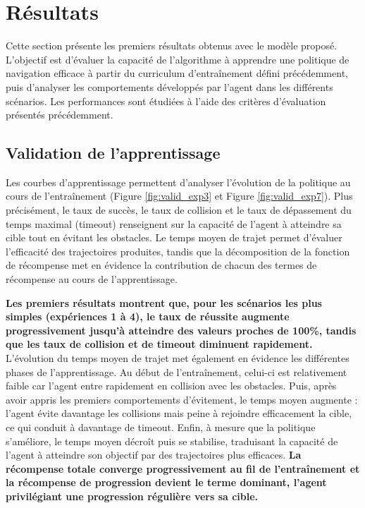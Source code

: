 \section{Résultats}

\begin{tcolorbox}[colback=black!5,colframe=black,title=]
Cette section présente les premiers résultats obtenus avec le modèle proposé. L'objectif est d'évaluer la capacité de l'algorithme à apprendre une politique de navigation efficace à partir du curriculum d'entraînement défini précédemment, puis d'analyser les comportements développés par l'agent dans les différents scénarios. Les performances sont étudiées à l'aide des critères d'évaluation présentés précédemment.
\end{tcolorbox}



\subsection{Validation de l'apprentissage}

\noindent Les courbes d'apprentissage permettent d'analyser l'évolution de la politique au cours de l'entraînement (Figure \ref{fig:valid_exp3} et Figure \ref{fig:valid_exp7}). Plus précisément, le taux de succès, le taux de collision et le taux de dépassement du temps maximal (timeout) renseignent sur la capacité de l'agent à atteindre sa cible tout en évitant les obstacles. Le temps moyen de trajet permet d'évaluer l'efficacité des trajectoires produites, tandis que la décomposition de la fonction de récompense met en évidence la contribution de chacun des termes de récompense au cours de l'apprentissage.

\vspace{10pt}

\noindent \textbf{Les premiers résultats montrent que, pour les scénarios les plus simples (expériences 1 à 4), le taux de réussite augmente progressivement jusqu'à atteindre des valeurs proches de 100\%, tandis que les taux de collision et de timeout diminuent rapidement.} L'évolution du temps moyen de trajet met également en évidence les différentes phases de l'apprentissage. Au début de l'entraînement, celui-ci est relativement faible car l'agent entre rapidement en collision avec les obstacles. Puis, après avoir appris les premiers comportements d'évitement, le temps moyen augmente : l'agent évite davantage les collisions mais peine à rejoindre efficacement la cible, ce qui conduit à davantage de timeout. Enfin, à mesure que la politique s'améliore, le temps moyen décroît puis se stabilise, traduisant la capacité de l'agent à atteindre son objectif par des trajectoires plus efficaces. \textbf{La récompense totale converge progressivement au fil de l'entraînement et la récompense de progression devient le terme dominant, l'agent privilégiant une progression régulière vers sa cible.}


